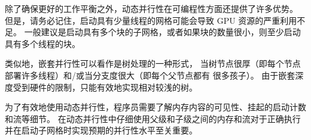 除了确保更好的工作平衡之外，动态并行性在可编程性方面还提供了许多优势。 
但是，请务必记住，启动具有少量线程的网格可能会导致 GPU 资源的严重利用不足。 
一般建议是启动具有多个块的子网格，或者如果块的数量很小，则至少启动具有多个线程的块。

类似地，嵌套并行性可以看作是树处理的一种形式，
当树节点很厚（即每个节点部署许多线程）和/或当分支度很大（即每个父节点都有 很多孩子）。 
由于嵌套深度受到硬件的限制，只能有效地实现相对较浅的树。

为了有效地使用动态并行性，程序员需要了解内存内容的可见性、挂起的启动计数和流等细节。 
在动态并行性中仔细使用父级和子级之间的内存和流对于正确执行并在启动子网格时实现预期的并行性水平至关重要。